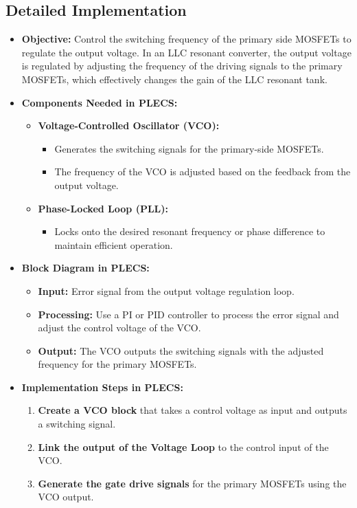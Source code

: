 \documentclass{article}
\begin{document}
\subsection{Detailed Implementation}
\begin{itemize}
    \item \textbf{Objective:} Control the switching frequency of the primary side MOSFETs to regulate the output voltage. In an LLC resonant converter, the output voltage is regulated by adjusting the frequency of the driving signals to the primary MOSFETs, which effectively changes the gain of the LLC resonant tank.
    \item \textbf{Components Needed in PLECS:}
    \begin{itemize}
        \item \textbf{Voltage-Controlled Oscillator (VCO):}
        \begin{itemize}
            \item Generates the switching signals for the primary-side MOSFETs.
            \item The frequency of the VCO is adjusted based on the feedback from the output voltage.
        \end{itemize}
        \item \textbf{Phase-Locked Loop (PLL):}
        \begin{itemize}
            \item Locks onto the desired resonant frequency or phase difference to maintain efficient operation.
        \end{itemize}
    \end{itemize}
    \item \textbf{Block Diagram in PLECS:}
    \begin{itemize}
        \item \textbf{Input:} Error signal from the output voltage regulation loop.
        \item \textbf{Processing:} Use a PI or PID controller to process the error signal and adjust the control voltage of the VCO.
        \item \textbf{Output:} The VCO outputs the switching signals with the adjusted frequency for the primary MOSFETs.
    \end{itemize}
    \item \textbf{Implementation Steps in PLECS:}
    \begin{enumerate}
        \item \textbf{Create a VCO block} that takes a control voltage as input and outputs a switching signal.
        \item \textbf{Link the output of the Voltage Loop} to the control input of the VCO.
        \item \textbf{Generate the gate drive signals} for the primary MOSFETs using the VCO output.
    \end{enumerate}
\end{itemize}
\end{document}
